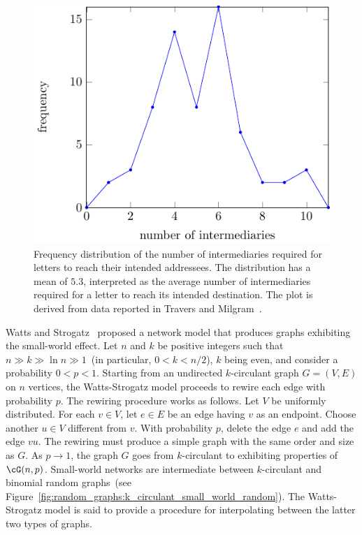 \begin{figure}[!htbp]
\centering
{}
\includegraphics{image/random-graphs/Milgram-small-world-experiment-results}
\caption{Frequency distribution of the number of intermediaries
  required for letters to reach their intended addressees. The
  distribution has a mean of $5.3$, interpreted as the average number
  of intermediaries required for a letter to reach its intended
  destination. The plot is derived from data reported in Travers and
  Milgram~\cite{TraversMilgram1969}.}
\label{fig:random_graphs:Milgram_small_world_experiment_results}
\end{figure}

Watts and
Strogatz~\cite{Watts1999a,Watts1999b,WattsStrogatz1998}
proposed a network model that produces graphs exhibiting the
small-world effect. Let $n$ and $k$ be positive integers such that
$n \gg k \gg \ln n \gg 1$~(in particular, $0 < k < n/2$), $k$ being
even, and consider a probability $0 < p < 1$. Starting from an
undirected $k$-circulant graph
$G = (V,E)$ on $n$ vertices, the
Watts-Strogatz model proceeds to rewire
each edge with probability $p$. The rewiring procedure works as
follows. Let $V$ be uniformly distributed. For each $v \in V$, let
$e \in E$ be an edge having $v$ as an endpoint. Choose another
$u \in V$ different from $v$. With probability $p$, delete the edge
$e$ and add the edge $vu$. The rewiring must produce a
simple graph with the same order and size as
$G$. As $p \to 1$, the graph $G$ goes from $k$-circulant to exhibiting
properties of $\cG(n,p)$. Small-world
networks are intermediate between $k$-circulant and binomial random
graphs~(see
Figure~\ref{fig:random_graphs:k_circulant_small_world_random}). The
Watts-Strogatz model is said to provide a procedure for interpolating
between the latter two types of graphs.


